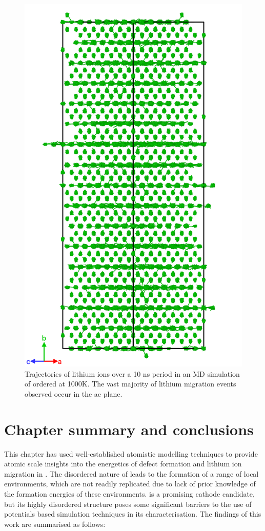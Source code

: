 \begin{figure}[p]
\centering
\includegraphics[height=0.85\textheight]{figures/static/trace_portrait}
\caption{Trajectories of lithium ions over a 10 ns period in an MD simulation of ordered  at 1000K. The vast majority of lithium migration events observed occur in the ac plane.}
\label{fig:trajectory}
\end{figure}


\newpage
\section{Chapter summary and conclusions}
This chapter has used well-established atomistic modelling techniques to provide atomic scale insights into the energetics of defect formation and lithium ion migration in .
The disordered nature of  leads to the formation of a range of local environments, which are not readily replicated due to lack of prior knowledge of the formation energies of these environments.
 is a promising cathode candidate, but its highly disordered structure poses some significant barriers to the use of potentials based simulation techniques in its characterisation.
The findings of this work are summarised as follows:

